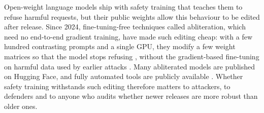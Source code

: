 Open-weight language models ship with safety training that teaches them to
refuse harmful requests, but their public weights allow this behaviour to be
edited after release. Since 2024, fine-tuning-free techniques called
abliteration, which need no end-to-end gradient training, have made such
editing cheap: with a few hundred contrasting prompts and a
single GPU, they modify a few weight matrices so that the model stops
refusing \cite{arditi2024refusal,labonne2024abliteration}, without the
gradient-based fine-tuning on harmful data used by earlier attacks
\cite{qi2024finetuning,lermen2023lora}. Many abliterated
models are published on Hugging Face, and fully automated tools are publicly
available \cite{heretic2025}. Whether safety training withstands such editing
therefore matters to attackers, to defenders and to anyone who audits whether
newer releases are more robust than older ones.

